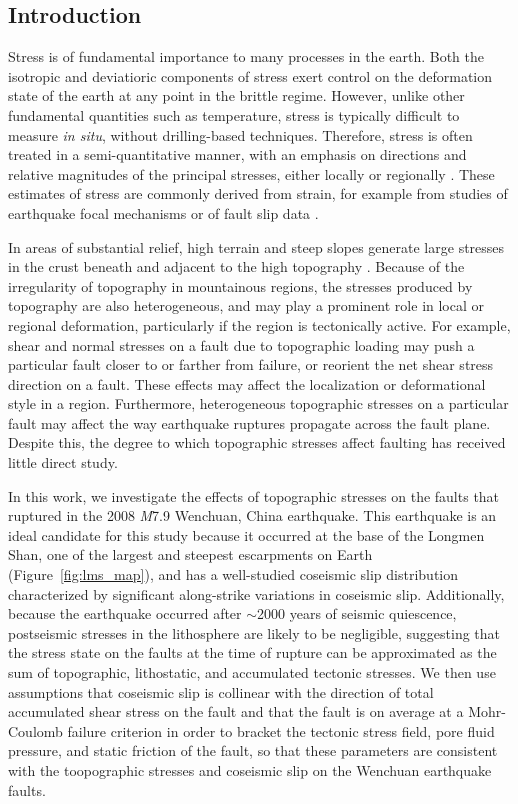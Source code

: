 \documentclass[draft,jgrga]{AGUTeX}
\begin{document}
\begin{article} \section{Introduction}\label{introduction}
Stress is of fundamental importance to many processes in the earth. Both the
isotropic and deviatioric components of stress exert control on the deformation
state of the earth at any point in the brittle regime. However, unlike other
fundamental quantities such as temperature, stress is typically difficult to
measure \emph{in situ}, without drilling-based techniques. Therefore, stress is
often treated in a semi-quantitative manner, with an emphasis on directions and
relative magnitudes of the principal stresses, either locally or regionally
\citep[e.g.,][]{angelier1994}. These estimates of stress are commonly derived
from strain, for example from studies of earthquake focal mechanisms
\citep[e.g.,][]{michael1987} or of fault slip data \citep[e.g.,][]{reches1987,
medinaluna2013}.

In areas of substantial relief, high terrain and steep slopes generate large
stresses in the crust beneath and adjacent to the high topography
\citep{jeffreys1924, coblentz1996}. Because of the irregularity of topography
in mountainous regions, the stresses produced by topography are also
heterogeneous, and may play a prominent role in local or regional deformation,
particularly if the region is tectonically active.  For example, shear and
normal stresses on a fault due to topographic loading may push a particular fault
closer to or farther from failure, or reorient the
net shear stress direction on a fault. These effects may affect the
localization or deformational style in a region. Furthermore, heterogeneous
topographic stresses on a particular fault may affect the way earthquake
ruptures propagate across the fault plane. Despite this, the degree to which
topographic stresses affect faulting has received little direct study.

In this work, we investigate the effects of topographic stresses on
the faults that ruptured in the 2008 \emph{M}7.9 Wenchuan, China
earthquake.  This earthquake is an ideal candidate for this study
because it occurred at the base of the Longmen Shan, one of the
largest and steepest escarpments on Earth (Figure~\ref{fig:lms_map}),
and has a well-studied coseismic slip distribution characterized by
significant along-strike variations in coseismic slip.  Additionally,
because the earthquake occurred after $\sim$2000 years of seismic
quiescence, postseismic stresses in the lithosphere are likely to be
negligible, suggesting that the stress state on the faults at the time
of rupture can be approximated as the sum of topographic, lithostatic,
and accumulated tectonic stresses. We then use assumptions that
coseismic slip is collinear with the direction of total accumulated
shear stress on the fault and that the fault is on average at a
Mohr-Coulomb failure criterion in order to bracket the tectonic stress
field, pore fluid pressure, and static friction of the fault, so that
these parameters are consistent with the toopographic stresses and
coseismic slip on the Wenchuan earthquake faults.


\end{article}
\end{document}
